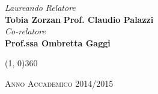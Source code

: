 \documentclass[a4paper, 12pt, twoside, openright]{book}
\begin{document}
\begin{titlepage}
\vfill
\begin{normalsize}
\begin{flushleft}
  \hspace{45pt} \textit{Laureando} \hspace{160pt} \textit{Relatore}\\
  \vspace{5pt}
  \hspace{30pt} \large{\textbf{Tobia Zorzan}} \hspace{70pt} \large{\textbf{Prof. Claudio Palazzi}}\\
  \vspace{10pt}
  \hspace{260pt} \normalsize{\textit{Co-relatore}}\\
  \vspace{5pt}
  \hspace{200pt} \large{\textbf{Prof.ssa Ombretta Gaggi}}
\end{flushleft}
\end{normalsize}

\vfill
\begin{center}
\hspace{-0.2cm}
\line(1, 0){360}

\textsc{Anno Accademico 2014/2015}
\end{center}
\end{titlepage}







\begingroup %
  \makeatletter
  \let\ps@plain\ps@empty
  \makeatother
  \tableofcontents
  \clearpage
\endgroup
\end{document}
